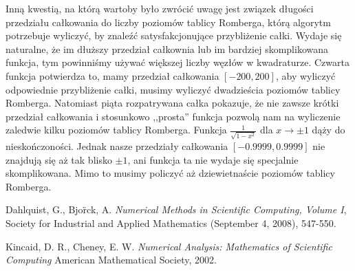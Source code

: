 \documentclass{article}
\begin{document}
Inną kwestią, na którą wartoby było zwrócić uwagę jest związek długości przedziału całkowania do liczby poziomów
tablicy Romberga, którą algorytm potrzebuje wyliczyć, by znaleźć satysfakcjonujące przybliżenie całki.
Wydaje się naturalne, że im dłuższy przedział całkownia lub im bardziej skomplikowana funkcja,
tym powinniśmy używać większej liczby węzłów w kwadraturze.
Czwarta funkcja potwierdza to, mamy przedział całkowania $[-200, 200]$, aby wyliczyć odpowiednie przybliżenie
całki, musimy wyliczyć dwadzieścia poziomów tablicy Romberga.
\newline
\newline
Natomiast piąta rozpatrywana całka pokazuje, że nie zawsze krótki przedział całkowania i stosunkowo ,,prosta'' funkcja
pozwolą nam na wyliczenie zaledwie kilku poziomów tablicy Romberga. Funkcja $\frac{1}{\sqrt{1 - x^2}}$ dla $x \to \pm 1$ dąży do nieskończoności.
Jednak nasze przedziały całkowania $[-0.9999,0.9999]$ nie znajdują się aż tak blisko $\pm 1$, ani funkcja ta
nie wydaje się specjalnie skomplikowana. Mimo to musimy policzyć aż dziewietnaście
poziomów tablicy Romberga.


\begin{thebibliography}{9}

Dahlquist, G., Bjo\"rck, A.
\emph{Numerical Methods in Scientific Computing, Volume I},
Society for Industrial and Applied Mathematics (September 4, 2008), 547-550.

Kincaid, D. R., Cheney, E. W.
\emph{Numerical Analysis: Mathematics of Scientific Computing}
American Mathematical Society, 2002.

\end{thebibliography}
\end{document}
